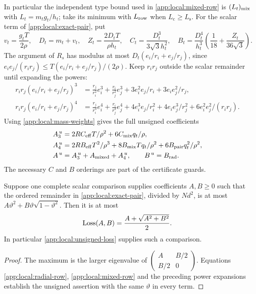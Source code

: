 In particular the independent type bound used in
\eqref{app:local:mixed-row} is $(L_t)_{\rm mix}$ with
$L_t=m_tg_t/h_t$; take its minimum with $L_{\rm row}$ when
$L_{\mathrm c}\ge L_{\mathrm s}$.
For the scalar term of \eqref{app:local:exact-pair}, put
\begin{equation}\label{app:local:unsigned-types}
 v_t=\frac{g_tT}{2\rho},\quad D_t=m_t+v_t,\quad
 Z_t=\frac{2D_tT}{\rho h_t},\quad
 C_t=\frac{D_t^3}{3\sqrt3h_t^2},\quad
 B_t=\frac{D_t^4}{h_t^3}\left(\frac1{18}+\frac{Z_t}{36\sqrt3}\right).
\end{equation}
The argument of $R_s$ has modulus at most
$D_t(e_i/r_i+e_j/r_j)$, since
$e_ie_j/(r_ir_j)\le T(e_i/r_i+e_j/r_j)/(2\rho)$.
Keep $r_ir_j$ outside the scalar remainder until expanding the powers:
\begin{align*}
 r_ir_j(e_i/r_i+e_j/r_j)^3
 &=\frac{r_j}{r_i^2}e_i^3+\frac{r_i}{r_j^2}e_j^3
       +3e_i^2e_j/r_i+3e_ie_j^2/r_j,\\
 r_ir_j(e_i/r_i+e_j/r_j)^4
 &=\frac{r_j}{r_i^3}e_i^4+\frac{r_i}{r_j^3}e_j^4
       +4e_i^3e_j/r_i^2+4e_ie_j^3/r_j^2
       +6e_i^2e_j^2/(r_ir_j).
\end{align*}
Using \eqref{app:local:mass-weights} gives the full unsigned coefficients
\begin{align}
 A_3^{\,u}&=2RC_{\rm eff}T/\rho^2+6C_{\rm mix}q_t/\rho,\nonumber\\
 A_4^{\,u}&=2RB_{\rm eff}T^2/\rho^3
             +8B_{\rm mix}Tq_t/\rho^2+6B_{\rm pair}q_t^2/\rho^2,
 \label{app:local:unsigned-loss}\\
 A^{\,u}&=A_3^{\,u}+A_{\rm mixed}+A_4^{\,u},\qquad B^{\,u}=B_{\rm rad}.
 \nonumber
\end{align}
The necessary $C$ and $B$ orderings are part of the certificate guards.

\begin{lemma}\label{app:local:loss}
Suppose one complete scalar comparison supplies coefficients $A,B\ge0$
such that the ordered remainder in \eqref{app:local:exact-pair}, divided
by $Nd^2$, is at most
$A\vartheta^2+B\vartheta\sqrt{1-\vartheta^2}$.
Then it is at most
\begin{equation}\label{app:local:loss-formula}
 {\rm Loss}(A,B)=\frac{A+\sqrt{A^2+B^2}}2.
\end{equation}
In particular \eqref{app:local:unsigned-loss} supplies such a comparison.
\end{lemma}
\begin{proof}
The maximum is the larger eigenvalue of
$\left(\begin{smallmatrix}A&B/2\\B/2&0\end{smallmatrix}\right)$.
Equations \eqref{app:local:radial-row},
\eqref{app:local:mixed-row} and the preceding power expansions establish
the unsigned assertion with the same $\vartheta$ in every term.
\end{proof}

